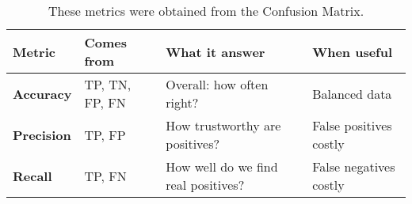 \begin{table}[!htp]
    \centering
    \begin{adjustbox}{width={\textwidth},totalheight={\textheight},keepaspectratio}
        \begin{tabular}{@{} l l l l @{}}
            \toprule
            Metric              & Comes from        & What it answer                        & When useful \\
            \midrule
            \textbf{Accuracy}   & TP, TN, FP, FN    & Overall: how often right?             & Balanced data \\ [.3em]
            \textbf{Precision}  & TP, FP            & How trustworthy are positives?        & False positives costly \\ [.3em]
            \textbf{Recall}     & TP, FN            & How well do we find real positives?   & False negatives costly \\
            \bottomrule
        \end{tabular}
    \end{adjustbox}
    \caption{These metrics were obtained from the Confusion Matrix.}
\end{table}

